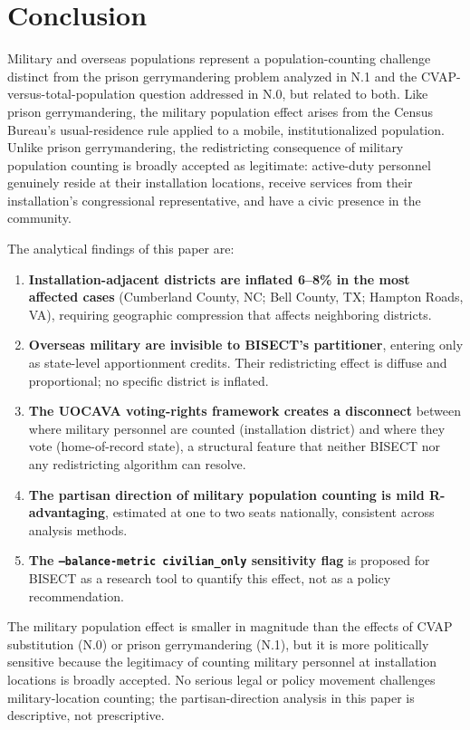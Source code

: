 \section{Conclusion}
\label{sec:conclusion}

Military and overseas populations represent a population-counting challenge distinct from the prison gerrymandering problem analyzed in N.1 and the CVAP-versus-total-population question addressed in N.0, but related to both. Like prison gerrymandering, the military population effect arises from the Census Bureau's usual-residence rule applied to a mobile, institutionalized population. Unlike prison gerrymandering, the redistricting consequence of military population counting is broadly accepted as legitimate: active-duty personnel genuinely reside at their installation locations, receive services from their installation's congressional representative, and have a civic presence in the community.

The analytical findings of this paper are:

\begin{enumerate}
    \item \textbf{Installation-adjacent districts are inflated 6--8\% in the most affected cases} (Cumberland County, NC; Bell County, TX; Hampton Roads, VA), requiring geographic compression that affects neighboring districts.
    \item \textbf{Overseas military are invisible to BISECT's partitioner}, entering only as state-level apportionment credits. Their redistricting effect is diffuse and proportional; no specific district is inflated.
    \item \textbf{The UOCAVA voting-rights framework creates a disconnect} between where military personnel are counted (installation district) and where they vote (home-of-record state), a structural feature that neither BISECT nor any redistricting algorithm can resolve.
    \item \textbf{The partisan direction of military population counting is mild R-advantaging}, estimated at one to two seats nationally, consistent across analysis methods.
    \item \textbf{The \texttt{--balance-metric civilian\_only} sensitivity flag} is proposed for BISECT as a research tool to quantify this effect, not as a policy recommendation.
\end{enumerate}

The military population effect is smaller in magnitude than the effects of CVAP substitution (N.0) or prison gerrymandering (N.1), but it is more politically sensitive because the legitimacy of counting military personnel at installation locations is broadly accepted. No serious legal or policy movement challenges military-location counting; the partisan-direction analysis in this paper is descriptive, not prescriptive.

